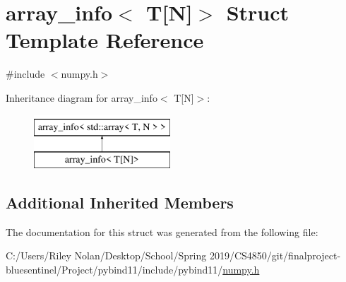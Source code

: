 \hypertarget{structarray__info_3_01_t[_n]_4}{}\section{array\+\_\+info$<$ T\mbox{[}N\mbox{]}$>$ Struct Template Reference}
\label{structarray__info_3_01_t[_n]_4}


{\ttfamily \#include $<$numpy.\+h$>$}

Inheritance diagram for array\+\_\+info$<$ T\mbox{[}N\mbox{]}$>$\+:\begin{figure}[H]
\begin{center}
\leavevmode
\includegraphics[height=2.000000cm]{structarray__info_3_01_t[_n]_4}
\end{center}
\end{figure}
\subsection*{Additional Inherited Members}


The documentation for this struct was generated from the following file\+:\begin{DoxyCompactItemize}
\item 
C\+:/\+Users/\+Riley Nolan/\+Desktop/\+School/\+Spring 2019/\+C\+S4850/git/finalproject-\/bluesentinel/\+Project/pybind11/include/pybind11/\mbox{\hyperlink{numpy_8h}{numpy.\+h}}\end{DoxyCompactItemize}
